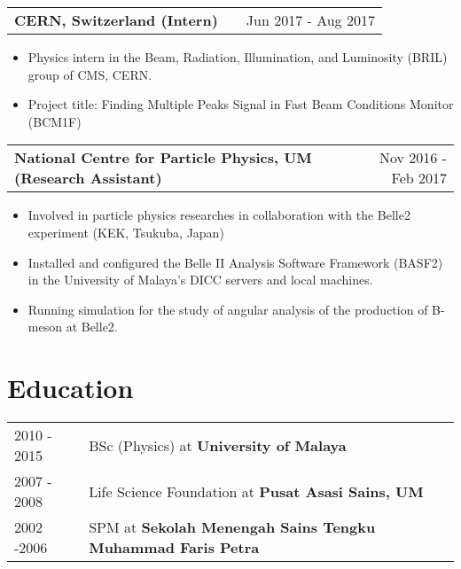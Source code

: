 \documentclass[a4paper,12pt]{article}
\makeatletter
\newenvironment{joblong}[2]
    {
    \begin{tabularx}{\linewidth}{@{}l X r@{}}
    \textbf{#1} & \hfill &  #2 \\[3.75pt]
    \end{tabularx}
    \begin{minipage}[t]{\linewidth}
    \begin{itemize}[nosep,after=\strut, leftmargin=1em, itemsep=3pt,label=--]
    }
    {
    \end{itemize}
    \end{minipage}    
    }
\makeatother
\begin{document}
\begin{joblong}{CERN, Switzerland (Intern)}{Jun 2017 - Aug 2017}
\item Physics intern in the Beam, Radiation, Illumination, and Luminosity (BRIL) group of CMS, CERN.
\item Project title: Finding Multiple Peaks Signal in Fast Beam Conditions Monitor (BCM1F)
\end{joblong}

\begin{joblong}{National Centre for Particle Physics, UM (Research Assistant)}{Nov 2016 - Feb 2017}
\item Involved in particle physics researches in collaboration with the Belle2 experiment (KEK, Tsukuba, Japan)
\item Installed and configured the Belle II Analysis Software Framework (BASF2) in the University of Malaya’s DICC servers and local machines.
\item Running simulation for the study of angular analysis of the production of B-meson at Belle2.
\end{joblong}

  


\section{Education}
\begin{tabularx}{\linewidth}{@{}l X@{}}	
2010 - 2015 & BSc (Physics) at \textbf{University of Malaya} \hfill \\

2007 - 2008 & Life Science Foundation at \textbf{Pusat Asasi Sains, UM} \hfill \\ 

2002 -2006 & SPM at \textbf{Sekolah Menengah Sains Tengku Muhammad Faris Petra} \hfill \\

\end{tabularx}
\end{document}
